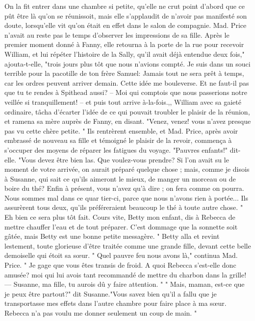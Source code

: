On la fit entrer dans une chambre si petite, qu'elle ne crut point d'abord que ce pût être là qu'on se réunissoit, mais elle s'applaudit de n'avoir pas manifesté son doute, lorsqu'elle vit qu'on était en effet dans le salon de compagnie. Mad. Price n'avait au reste pas le temps d'observer les impressions de sa fille. Après le premier moment donné à Fanny, elle retourna à la porte de la rue pour recevoir William, et lui répéter l'histoire de la Sally, qu'il avait déjà entendue\setcounter{page}{384} deux fois," ajouta-t-elle, "trois jours plus tôt que nous n'avions compté. Je suis dans un souci terrible pour la pacotille de ton frère Samuel: Jamais tout ne sera prêt à temps, car les ordres peuvent arriver demain. Cette idée me bouleverse. Et ne faut-il pas que tu te rendes à Spithead aussi? – Moi qui comptois que nous passerions notre veillée si tranquillement! – et puis tout arrive à-la-fois.,, William avec sa gaieté ordinaire, tâcha d'écarter l'idée de ce qui pouvait troubler le plaisir de la réunion, et ramena sa mère auprès de Fanny, en disant. "Venez, venez! vous n'avez presque pas vu cette chère petite. "
Ils rentrèrent ensemble, et Mad. Price, après avoir embrassé de nouveau sa fille et témoigné le plaisir de la revoir, commença à s'occuper des moyens de réparer les fatigues du voyage. "Pauvres enfants!" dit-elle. "Vous devez être bien las. Que voulez-vous prendre? Si l'on avait su le moment de votre arrivée, on aurait préparé quelque chose ; mais, comme je disois à Susanne, qui sait ce qu'ils aimeront le mieux, de manger un morceau ou de boire du thé? Enfin à présent, vous n'avez qu'à dire ; on fera comme on pourra. Nous sommes mal dans ce quar\setcounter{page}{385} tier-ci, parce que nous n'avons rien à portée... Ils assurèrent tous deux, qu'ils préféreraient beaucoup le thé à toute autre chose. " Eh bien ce sera plus tôt fait. Cours vite, Betty mon enfant, dis à Rebecca de mettre chauffer l'eau et de tout préparer. C'est dommage que la sonnette soit gâtée, mais Betty est une bonne petite messagère. "
Betty alla et revint lestement, toute glorieuse d'être traitée comme une grande fille, devant cette belle demoiselle qui étoit sa sœur.
" Quel pauvre feu nous avons là," continua Mad. Price. " Je gage que vous êtes transis de froid. A quoi Rebecca s'est-elle donc amusée? moi qui lui avois tant recommandé de mettre du charbon dans la grille! — Susanne, ma fille, tu aurois dû y faire attention. "
" Mais, maman, est-ce que je peux être partout?" dit Susanne."Vous savez bien qu'il a fallu que je transportasse mes effets dans l'autre chambre pour faire place à ma sœur. Rebecca n'a pas voulu me donner seulement un coup de main. "
